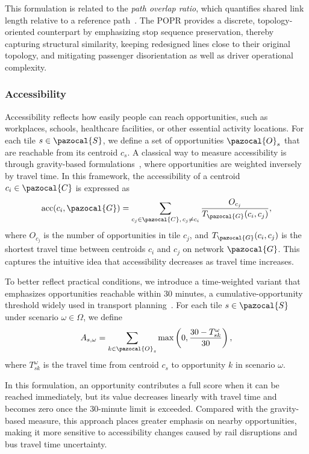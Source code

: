 \documentclass[3p,times,procedia]{elsarticle}
\begin{document}
This formulation is related to the \emph{path overlap ratio}, which quantifies shared link length relative to a reference path~\citep{Lim2005PathOverlap}. The POPR provides a discrete, topology-oriented counterpart by emphasizing stop sequence preservation, thereby capturing structural similarity, keeping redesigned lines close to their original topology, and mitigating passenger disorientation as well as driver operational complexity.
\subsubsection{Accessibility}\label{sec:TWA}
Accessibility reflects how easily people can reach opportunities, such as workplaces, schools, healthcare facilities, or other essential activity locations. 
%
For each tile $s \in \pazocal{S}$, we define a set of opportunities $\pazocal{O}_s$ that are reachable from its centroid $c_s$.  
%
A classical way to measure accessibility is through gravity-based formulations~\citep{hansen1959accessibility,geurs2004accessibility},
where opportunities are weighted inversely by travel time.
In this framework, the accessibility of a centroid $c_i \in \pazocal{C}$ is expressed as
\begin{equation}
    \text{acc}(c_i, \pazocal{G}) = \sum_{c_j \in \pazocal{C}, \, c_j \neq c_i} \frac{O_{c_j}}{T_{\pazocal{G}}(c_i, c_j)},
\end{equation}
where $O_{c_j}$ is the number of opportunities in tile $c_j$, 
and $T_{\pazocal{G}}(c_i, c_j)$ is the shortest travel time between centroids $c_i$ and $c_j$ on network $\pazocal{G}$. 
This captures the intuitive idea that accessibility decreases as travel time increases.  

To better reflect practical conditions, we introduce a time-weighted variant that emphasizes opportunities reachable within 30 minutes,
a cumulative-opportunity threshold widely used in transport planning~\citep{geurs2004accessibility}.
For each tile $s \in \pazocal{S}$ under scenario $\omega \in \Omega$, we define
\begin{equation}
    A_{s,\omega} = \sum_{k \in \pazocal{O}_s} \max\left(0, \frac{30 - T_{sk}^\omega}{30}\right),
    \label{eq:Acc}
\end{equation}
where $T_{sk}^\omega$ is the travel time from centroid $c_s$ to opportunity $k$ in scenario $\omega$.  

In this formulation, an opportunity contributes a full score when it can be reached immediately, 
but its value decreases linearly with travel time and becomes zero once the 30-minute limit is exceeded. 
Compared with the gravity-based measure, this approach places greater emphasis on nearby opportunities, 
making it more sensitive to accessibility changes caused by rail disruptions and bus travel time uncertainty.
\end{document}
